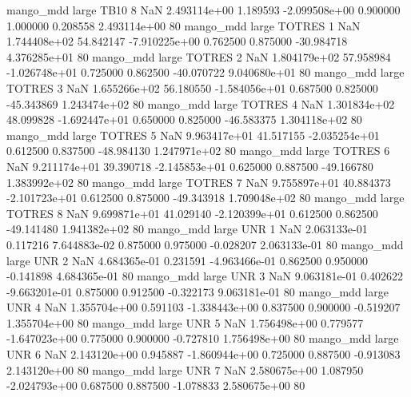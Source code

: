        mango_mdd      large     TB10                 8                  NaN 2.493114e+00      1.189593 -2.099508e+00 0.900000 1.000000       0.208558 2.493114e+00 80
        mango_mdd      large   TOTRES                 1                  NaN 1.744408e+02     54.842147 -7.910225e+00 0.762500 0.875000     -30.984718 4.376285e+01 80
        mango_mdd      large   TOTRES                 2                  NaN 1.804179e+02     57.958984 -1.026748e+01 0.725000 0.862500     -40.070722 9.040680e+01 80
        mango_mdd      large   TOTRES                 3                  NaN 1.655266e+02     56.180550 -1.584056e+01 0.687500 0.825000     -45.343869 1.243474e+02 80
        mango_mdd      large   TOTRES                 4                  NaN 1.301834e+02     48.099828 -1.692447e+01 0.650000 0.825000     -46.583375 1.304118e+02 80
        mango_mdd      large   TOTRES                 5                  NaN 9.963417e+01     41.517155 -2.035254e+01 0.612500 0.837500     -48.984130 1.247971e+02 80
        mango_mdd      large   TOTRES                 6                  NaN 9.211174e+01     39.390718 -2.145853e+01 0.625000 0.887500     -49.166780 1.383992e+02 80
        mango_mdd      large   TOTRES                 7                  NaN 9.755897e+01     40.884373 -2.101723e+01 0.612500 0.875000     -49.343918 1.709048e+02 80
        mango_mdd      large   TOTRES                 8                  NaN 9.699871e+01     41.029140 -2.120399e+01 0.612500 0.862500     -49.141480 1.941382e+02 80
        mango_mdd      large      UNR                 1                  NaN 2.063133e-01      0.117216  7.644883e-02 0.875000 0.975000      -0.028207 2.063133e-01 80
        mango_mdd      large      UNR                 2                  NaN 4.684365e-01      0.231591 -4.963466e-01 0.862500 0.950000      -0.141898 4.684365e-01 80
        mango_mdd      large      UNR                 3                  NaN 9.063181e-01      0.402622 -9.663201e-01 0.875000 0.912500      -0.322173 9.063181e-01 80
        mango_mdd      large      UNR                 4                  NaN 1.355704e+00      0.591103 -1.338443e+00 0.837500 0.900000      -0.519207 1.355704e+00 80
        mango_mdd      large      UNR                 5                  NaN 1.756498e+00      0.779577 -1.647023e+00 0.775000 0.900000      -0.727810 1.756498e+00 80
        mango_mdd      large      UNR                 6                  NaN 2.143120e+00      0.945887 -1.860944e+00 0.725000 0.887500      -0.913083 2.143120e+00 80
        mango_mdd      large      UNR                 7                  NaN 2.580675e+00      1.087950 -2.024793e+00 0.687500 0.887500      -1.078833 2.580675e+00 80
